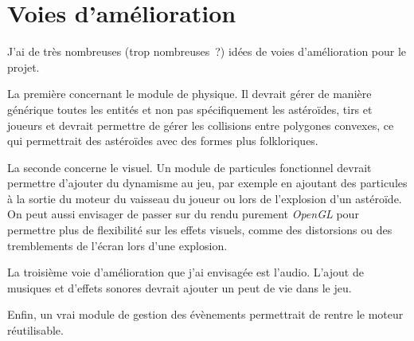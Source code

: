 \documentclass[10pt, french, a4paper]{report}
\begin{document}
\section{Voies d'amélioration}

J'ai de très nombreuses (trop nombreuses~?) idées de  voies d'amélioration pour le projet.

La  première concernant le module de physique. Il devrait gérer de manière générique
toutes les entités et non pas spécifiquement les astéroïdes, tirs et joueurs et devrait 
permettre de gérer les collisions entre polygones convexes, ce qui permettrait des 
astéroïdes avec des formes plus folkloriques.

La seconde concerne le visuel. Un module de particules fonctionnel devrait permettre 
d'ajouter du dynamisme au jeu, par exemple en ajoutant des particules à la sortie du 
moteur du vaisseau du joueur ou lors de l'explosion d'un astéroïde. On peut aussi 
envisager de passer sur du rendu purement \textit{OpenGL} pour permettre plus de 
flexibilité sur les effets visuels, comme des distorsions ou des tremblements de 
l'écran lors d'une explosion.

La troisième voie d'amélioration que j'ai envisagée est l'audio. 
L'ajout de musiques et d'effets sonores devrait ajouter un peut de vie dans le jeu.

Enfin, un vrai module de gestion des évènements permettrait de rentre le moteur 
réutilisable.
\end{document}
